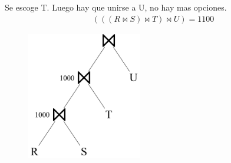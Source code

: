 \documentclass{templateNote}
\begin{document}
\begin{enumerate}
\begin{enumerate}[label=\alph*)]
            Se escoge T. Luego hay que unirse a U, no hay mas opciones.
            \begin{align*}
                (((R \Join S)\Join T)\Join U) = 1100
            \end{align*}

            \begin{figure}[H]
                \centering
                \includegraphics[width=5cm]{img/img3.png}
            \end{figure}

        \end{enumerate}

\end{enumerate}

\newpage
\end{document}
